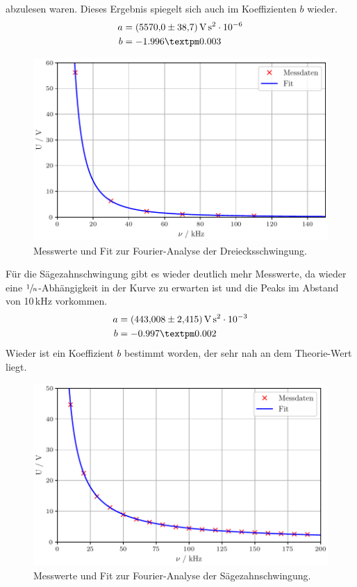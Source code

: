 abzulesen waren. Dieses Ergebnis spiegelt sich auch im Koeffizienten $b$ wieder.
\begin{align*}
  a &= \SI{5570 +- 38.7}{\volt\second\squared}\cdot10^{-6}\\
  b &= -1.996 ± 0.003
\end{align*}
\begin{figure}[H]
  \centering
  \includegraphics[scale=0.6]{plotb.pdf}
  \caption{Messwerte und Fit zur Fourier-Analyse der Dreiecksschwingung.}
  \label{fig:Plot2}
\end{figure}\noindent
Für die Sägezahnschwingung gibt es wieder deutlich mehr Messwerte, da wieder eine $\sfrac{1}{n}$-Abhängigkeit in der Kurve zu erwarten
ist und die Peaks im Abstand von 10\,kHz vorkommen.
\begin{align*}
  a &= \SI{443.008 +- 2.415}{\volt\second\squared}\cdot10^{-3}\\
  b &= -0.997 ± 0.002
\end{align*} 
Wieder ist ein Koeffizient $b$ bestimmt worden, der sehr nah an dem Theorie-Wert liegt.
\begin{figure}[H]
  \centering
  \includegraphics[scale=0.6]{plotc.pdf} 
  \caption{Messwerte und Fit zur Fourier-Analyse der Sägezahnschwingung.}
  \label{fig:Plot3}
\end{figure} 